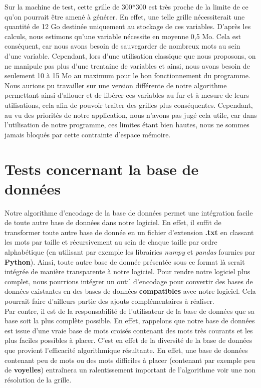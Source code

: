 \documentclass [ 11 pt ] {article}
\begin{document}
            Sur la machine de test, cette grille de 300*300 est très proche de la limite de ce qu'on pourrait être amené à générer. En effet, une telle grille nécessiterait une quantité de 12 Go destinée uniquement au stockage de ces variables. D'après les calculs, nous estimons qu'une variable nécessite en moyenne 0,5 Mo. Cela est conséquent, car nous avons besoin de sauvegarder de nombreux mots au sein d'une variable. Cependant, lors d'une utilisation classique que nous proposons, on ne manipule pas plus d'une trentaine de variables et ainsi, nous avons besoin de seulement 10 à 15 Mo au maximum pour le bon fonctionnement du programme. Nous aurions pu travailler sur une version différente de notre algorithme permettant ainsi d'allouer et de libérer ces variables au fur et à mesure de leurs utilisations, cela afin de pouvoir traiter des grilles plus conséquentes. Cependant, au vu des priorités de notre application, nous n'avons pas jugé cela utile, car dans l'utilisation de notre programme, ces limites étant bien hautes, nous ne sommes jamais bloqués par cette contrainte d'espace mémoire.
            
            \newpage
        
    \section{Tests concernant la base de données}
    
    Notre algorithme d'encodage de la base de données permet une intégration facile de toute autre base de données dans notre logiciel. En effet, il suffit de transformer toute autre base de donnée en un fichier d'extension \textbf{.txt} en classant les mots par taille et récursivement au sein de chaque taille par ordre alphabétique (en utilisant par exemple les librairies \textit{numpy} et \textit{pandas} fournies par \textbf{Python}). Ainsi, toute autre base de donnée présentée sous ce format là serait intégrée de manière transparente à notre logiciel. Pour rendre notre logiciel plus complet, nous pourrions intégrer un outil d'encodage pour convertir des bases de données existantes en des bases de données \textbf{compatibles} avec notre logiciel. Cela pourrait faire d'ailleurs partie des ajouts complémentaires à réaliser. \\
    
    Par contre, il est de la responsabilité de l'utilisateur de la base de données que sa base soit la plus complète possible. En effet, rappelons que notre base de données est issue d'une vraie base de mots croisés contenant des mots très courants et les plus faciles possibles à placer. C'est en effet de la diversité de la base de données que provient l'efficacité algorithmique résultante. En effet, une base de données contenant peu de mots ou des mots difficiles à placer (contenant par exemple peu de \textbf{voyelles}) entraînera un ralentissement important de l'algorithme voir une non résolution de la grille. \\
    
\end{document}
